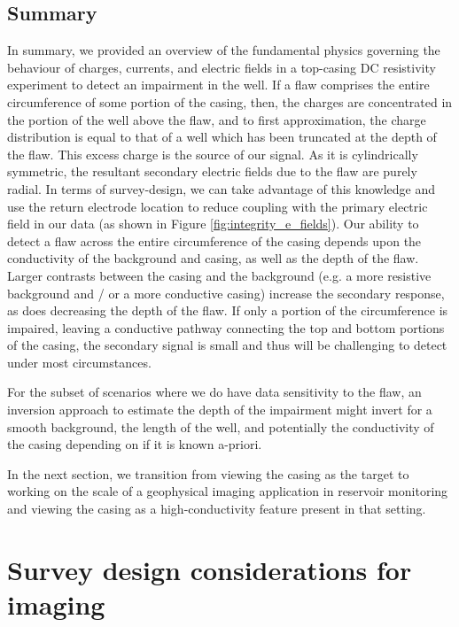 

\subsection{Summary}
In summary, we provided an overview of the fundamental physics governing the behaviour of charges, currents, and electric fields in a top-casing DC resistivity experiment to detect an impairment in the well. If a flaw comprises the entire circumference of some portion of the casing, then, the charges are concentrated in the portion of the well above the flaw, and to first approximation, the charge distribution is equal to that of a well which has been truncated at the depth of the flaw. This excess charge is the source of our signal. As it is cylindrically symmetric, the resultant secondary electric fields due to the flaw are purely radial. In terms of survey-design, we can take advantage of this knowledge and use the return electrode location to reduce coupling with the primary electric field in our data (as shown in Figure \ref{fig:integrity_e_fields}). Our ability to detect a flaw across the entire circumference of the casing depends upon the conductivity of the background and casing, as well as the depth of the flaw. Larger contrasts between the casing and the background (e.g. a more resistive background and / or a more conductive casing) increase the secondary response, as does decreasing the depth of the flaw. If only a portion of the circumference is impaired, leaving a conductive pathway connecting the top and bottom portions of the casing, the secondary signal is small and thus will be challenging to detect under most circumstances.

For the subset of scenarios where we do have data sensitivity to the flaw, an inversion approach to estimate the depth of the impairment might invert for a smooth background, the length of the well, and potentially the conductivity of the casing depending on if it is known a-priori.

In the next section, we transition from viewing the casing as the target to working on the scale of a geophysical imaging application in reservoir monitoring and viewing the casing as a high-conductivity feature present in that setting.

\section{Survey design considerations for imaging}
\label{sec:survey_design}

